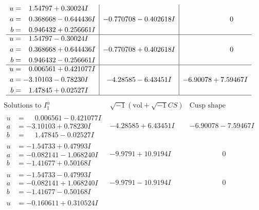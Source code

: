 \documentclass[1p]{elsarticle_modified}
\theoremstyle{definition}
\newcommand{\I}{\sqrt{-1}}
\begin{document}
$$\begin{array}{c|c|c}
\begin{aligned}
u &= \phantom{-}1.54797 + 0.30024 I \\
a &= \phantom{-}0.368668 - 0.644436 I \\
b &= \phantom{-}0.946432 + 0.256661 I\end{aligned}
 & -0.770708 - 0.402618 I & \phantom{-0.000000 } 0 \\ \hline\begin{aligned}
u &= \phantom{-}1.54797 - 0.30024 I \\
a &= \phantom{-}0.368668 + 0.644436 I \\
b &= \phantom{-}0.946432 - 0.256661 I\end{aligned}
 & -0.770708 + 0.402618 I & \phantom{-0.000000 } 0 \\ \hline\begin{aligned}
u &= \phantom{-}0.006561 + 0.421077 I \\
a &= -3.10103 - 0.78230 I \\
b &= \phantom{-}1.47845 + 0.02527 I\end{aligned}
 & -4.28585 - 6.43451 I & -6.90078 + 7.59467 I\\
 \hline 
 \end{array}$$\newpage$$\begin{array}{c|c|c}  
\text{Solutions to }I^u_{1}& \I (\text{vol} + \sqrt{-1}CS) & \text{Cusp shape}\\
 \hline 
\begin{aligned}
u &= \phantom{-}0.006561 - 0.421077 I \\
a &= -3.10103 + 0.78230 I \\
b &= \phantom{-}1.47845 - 0.02527 I\end{aligned}
 & -4.28585 + 6.43451 I & -6.90078 - 7.59467 I \\ \hline\begin{aligned}
u &= -1.54733 + 0.47993 I \\
a &= -0.082141 - 1.068240 I \\
b &= -1.41677 + 0.50168 I\end{aligned}
 & -9.9791 + 10.9194 I & \phantom{-0.000000 } 0 \\ \hline\begin{aligned}
u &= -1.54733 - 0.47993 I \\
a &= -0.082141 + 1.068240 I \\
b &= -1.41677 - 0.50168 I\end{aligned}
 & -9.9791 - 10.9194 I & \phantom{-0.000000 } 0 \\ \hline\begin{aligned}
u &= -0.160611 + 0.310524 I \\

\end{aligned}
\end{array}$$
\end{document}
